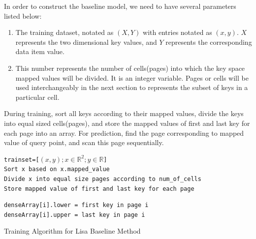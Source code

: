 In order to construct the baseline model, we need to have several parameters listed below:
\begin{enumerate}
	\item The training dataset, notated as $(X, Y)$ with entries notated as $(x,y)$. $X$ represents the two dimensional key values, and $Y$ represents the corresponding data item value. 
	\item This number represents the number of cells(pages) into which the key space mapped values will be divided. It is an integer variable. Pages or cells will be used interchangeably in the next section to represents the subset of keys in a particular cell. 
\end{enumerate}

During training, sort all keys according to their mapped values, divide the keys into equal sized cells(pages), and store the mapped values of first and last key for each page into an array. For prediction, find the page corresponding to mapped value of query point, and scan this page sequentially. 

\begin{algorithm}[H]
    \SetAlgoLined
      \texttt{trainset=[$(x,y);x \in \mathbb{R}^{2};y \in \mathbb{R}$]} \\
     \texttt{Sort x based on x.mapped\_value}\\
     \texttt{Divide x into equal size pages according to num\_of\_cells}\\
     \texttt{Store mapped value of first and last key for each page }\\
     {
         \texttt{denseArray[i].lower = first key in page i  } \\
		 \texttt{denseArray[i].upper = last key in page i  }
		
     }
     \caption{Training Algorithm for Lisa Baseline Method}
     \label{Training_Lisa_Baseline}
\end{algorithm}

